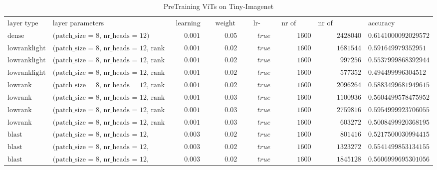 \begin{sidewaystable}[h!]
\centering
\tiny
\caption{PreTraining ViTs on Tiny-Imagenet}
\label{tab:pt_results}
\begin{tabular}{llcccrrl}
$\text{layer type}$ & $\text{layer parameters}$ & $\text{learning rate}$ & $\text{weight decay}$ & $\text{lr-decay}$ & $\text{nr of epochs}$ & $\text{nr of parameters}$ & $\text{accuracy}$\\
$\text{dense}$ & $\text{(patch\_size = 8, nr\_heads = 12)}$ & $0.001$ & $0.05$ & $true$ & $1600$ & $2428040$ & $0.6141000092029572$\\
$\text{lowranklight}$ & $\text{(patch\_size = 8, nr\_heads = 12, rank = 96)}$ & $0.001$ & $0.02$ & $true$ & $1600$ & $1681544$ & $0.591649979352951$\\
$\text{lowranklight}$ & $\text{(patch\_size = 8, nr\_heads = 12, rank = 48)}$ & $0.001$ & $0.02$ & $true$ & $1600$ & $997256$ & $0.5537999868392944$\\
$\text{lowranklight}$ & $\text{(patch\_size = 8, nr\_heads = 12, rank = 24)}$ & $0.001$ & $0.02$ & $true$ & $1600$ & $577352$ & $0.494499996304512$\\
$\text{lowrank}$ & $\text{(patch\_size = 8, nr\_heads = 12, rank = 96)}$ & $0.001$ & $0.02$ & $true$ & $1600$ & $2096264$ & $0.5883499681949615$\\
$\text{lowrank}$ & $\text{(patch\_size = 8, nr\_heads = 12, rank = 48)}$ & $0.001$ & $0.03$ & $true$ & $1600$ & $1100936$ & $0.5604499578475952$\\
$\text{lowrank}$ & $\text{(patch\_size = 8, nr\_heads = 12, rank = 128)}$ & $0.001$ & $0.03$ & $true$ & $1600$ & $2759816$ & $0.5954999923706055$\\
$\text{lowrank}$ & $\text{(patch\_size = 8, nr\_heads = 12, rank = 24)}$ & $0.001$ & $0.03$ & $true$ & $1600$ & $603272$ & $0.5008499920368195$\\
$\text{blast}$ & $\text{(patch\_size = 8, nr\_heads = 12, block\_size = 48, rank = 32)}$ & $0.003$ & $0.02$ & $true$ & $1600$ & $801416$ & $0.5217500030994415$\\
$\text{blast}$ & $\text{(patch\_size = 8, nr\_heads = 12, block\_size = 48, rank = 56)}$ & $0.003$ & $0.02$ & $true$ & $1600$ & $1323272$ & $0.5541499853134155$\\
$\text{blast}$ & $\text{(patch\_size = 8, nr\_heads = 12, block\_size = 48, rank = 80)}$ & $0.003$ & $0.02$ & $true$ & $1600$ & $1845128$ & $0.5606999695301056$\\
\end{tabular}

\end{sidewaystable}
